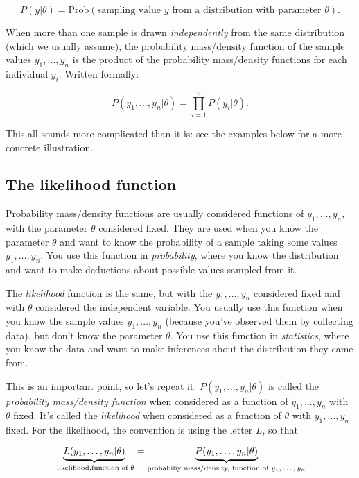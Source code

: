 \documentclass[11pt]{article}
\begin{document}
\[
P(y | \theta) = \text{Prob} (\text{sampling value $y$ from a distribution with parameter $\theta$}).
\]

When more than one sample is drawn \emph{independently} from the same
distribution (which we usually assume), the probability mass/density
function of the sample values \(y_1, \ldots, y_n\) is the product of the
probability mass/density functions for each individual \(y_i\). Written
formally:

\[
P(y_1, \ldots, y_n | \theta) = \prod_{i=1}^n P(y_i | \theta).
\]

This all sounds more complicated than it is: see the examples below for
a more concrete illustration.

    \hypertarget{the-likelihood-function}{%
\subsection{The likelihood function}\label{the-likelihood-function}}

Probability mass/density functions are usually considered functions of
\(y_1, \ldots, y_n\), with the parameter \(\theta\) considered fixed.
They are used when you know the parameter \(\theta\) and want to know
the probability of a sample taking some values \(y_1, \ldots, y_n\). You
use this function in \emph{probability}, where you know the distribution
and want to make deductions about possible values sampled from it.

The \emph{likelihood} function is the same, but with the
\(y_1, \ldots, y_n\) considered fixed and with \(\theta\) considered the
independent variable. You usually use this function when you know the
sample values \(y_1, \ldots, y_n\) (because you've observed them by
collecting data), but don't know the parameter \(\theta\). You use this
function in \emph{statistics}, where you know the data and want to make
inferences about the distribution they came from.

This is an important point, so let's repeat it:
\(P(y_1, \ldots, y_n | \theta)\) is called the \emph{probability
mass/density function} when considered as a function of
\(y_1, \ldots, y_n\) with \(\theta\) fixed. It's called the
\emph{likelihood} when considered as a function of \(\theta\) with
\(y_1, \ldots, y_n\) fixed. For the likelihood, the convention is using
the letter \(L\), so that

\[
\underbrace{L(y_1, \ldots, y_n | \theta)}_{\text{ likelihood,} \\ \text{function of $\theta$}} = \underbrace{P(y_1, \ldots, y_n | \theta)}_{\text{probabiliy mass/density,} \\ \text{ function of $y_1, \ldots, y_n$}}
\]
\end{document}
